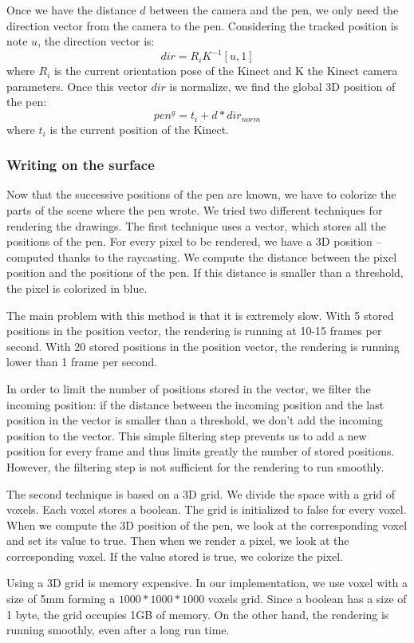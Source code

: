 \documentclass[12pt]{article}
\begin{document}
Once we have the distance $d$ between the camera and the pen, we only need the direction vector from the camera to the pen. Considering the tracked position is note $u$, the direction vector is:
$$dir = R_iK^{-1}[u,1]$$
where $R_i$ is the current orientation pose of the Kinect and K the Kinect camera parameters. Once this vector $dir$ is normalize, we find the global 3D position of the pen:
$$pen^g = t_i + d*dir_{norm}$$
where $t_i$ is the current position of the Kinect.

\subsubsection{Writing on the surface}
Now that the successive positions of the pen are known, we have to colorize the parts of the scene where the pen wrote. We tried two different techniques for rendering the drawings. The first technique uses a vector, which stores all the positions of the pen. For every pixel to be rendered, we have a 3D position -- computed thanks to the raycasting. We compute the distance between the pixel position and the positions of the pen. If this distance is smaller than a threshold, the pixel is colorized in blue.

The main problem with this method is that it is extremely slow. With 5 stored positions in the position vector, the rendering is running at 10-15 frames per second. With 20 stored positions in the position vector, the rendering is running lower than 1 frame per second.

In order to limit the number of positions stored in the vector, we filter the incoming position: if the distance between the incoming position and the last position in the vector is smaller than a threshold, we don't add the incoming position to the vector. This simple filtering step prevents us to add a new position for every frame and thus limits greatly the number of stored positions. However, the filtering step is not sufficient for the rendering to run smoothly.

The second technique is based on a 3D grid. We divide the space with a grid of voxels. Each voxel stores a boolean. The grid is initialized to false for every voxel. When we compute the 3D position of the pen, we look at the corresponding voxel and set its value to true. Then when we render a pixel, we look at the corresponding voxel. If the value stored is true, we colorize the pixel.

Using a 3D grid is memory expensive. In our implementation, we use voxel with a size of 5mm forming a $1000*1000*1000$ voxels grid. Since a boolean has a size of 1 byte, the grid occupies 1GB of memory. On the other hand, the rendering is running smoothly, even after a long run time.
\end{document}
